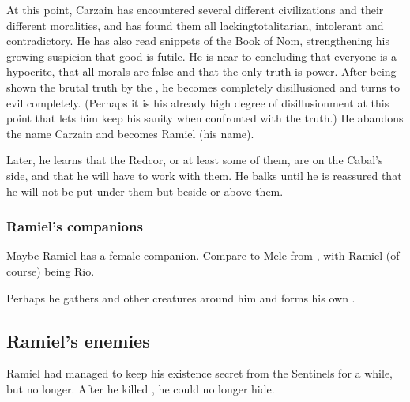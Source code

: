 At this point, Carzain has encountered several different civilizations and their different moralities, and has found them all lacking\dash{}totalitarian, intolerant and contradictory. He has also read snippets of the Book of Nom, strengthening his growing suspicion that good is futile. He is near to concluding that everyone is a hypocrite, that all morals are false and that the only truth is power. 
After being shown the brutal truth by the \banes, he becomes completely disillusioned and turns to evil completely. (Perhaps it is his already high degree of disillusionment at this point that lets him keep his sanity when confronted with the truth.) 
He abandons the name Carzain \Shireyo{} and becomes Ramiel (his \Malach{} name). 

Later, he learns that the Redcor, or at least some of them, are on the Cabal's side, and that he will have to work with them. He balks until he is reassured that he will not be put under them but beside or above them. 








\subsubsection{Ramiel's companions}
Maybe Ramiel has a female companion. 
Compare to Mele from \emph{\JuukenSentaiGekiranger}, with Ramiel (of course) being Rio. 

Perhaps he gathers \vorcanths{} and other creatures around him and forms his own \Rinjuuken. 









\subsection{Ramiel's enemies}
Ramiel had managed to keep his existence secret from the Sentinels for a while, but no longer. 
After he killed \Shiaraid, he could no longer hide. 

